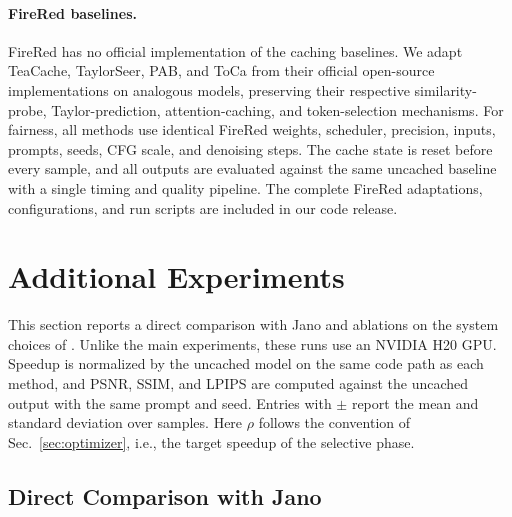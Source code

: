 \paragraph{FireRed baselines.} FireRed has no official implementation of the caching baselines. We adapt TeaCache, TaylorSeer, PAB, and ToCa from their official open-source implementations on analogous models, preserving their respective similarity-probe, Taylor-prediction, attention-caching, and token-selection mechanisms. For fairness, all methods use identical FireRed weights, scheduler, precision, inputs, prompts, seeds, CFG scale, and denoising steps. The cache state is reset before every sample, and all outputs are evaluated against the same uncached baseline with a single timing and quality pipeline. The complete FireRed adaptations, configurations, and run scripts are included in our code release.

\begin{table}[h]
\centering
\caption{Parameters setting and performance of \cubic }
\label{tab:detail}

\end{table}

\begin{table}[h]
\centering
\caption{Parameters setting and performance of baselines. }
\label{tab:detail_baseline}

\end{table}

\newpage

\section{Additional Experiments}
\label{app:extra_exp}
This section reports a direct comparison with Jano and ablations on the system choices of \cubic. Unlike the main experiments, these runs use an NVIDIA H20 GPU. Speedup is normalized by the uncached model on the same code path as each method, and PSNR, SSIM, and LPIPS are computed against the uncached output with the same prompt and seed. Entries with $\pm$ report the mean and standard deviation over samples. Here $\rho$ follows the convention of Sec.~\ref{sec:optimizer}, i.e., the target speedup of the selective phase.

\subsection{Direct Comparison with Jano}
\label{app:jano}
